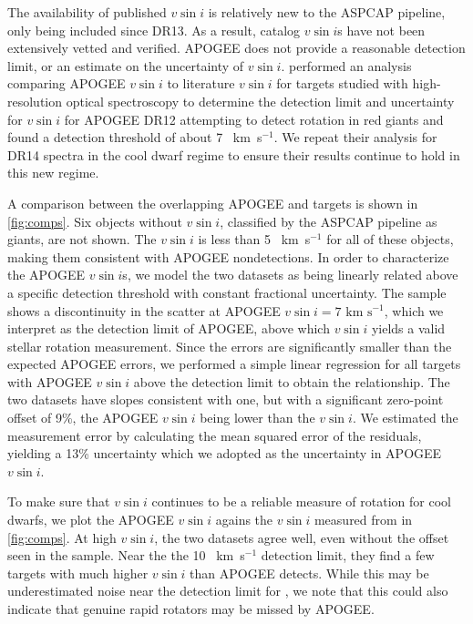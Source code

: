 \documentclass[manuscript]{aastex6}
\newcommand{\vsini}{\ensuremath{v \sin i}}
\newcommand{\kms}{\textrm{~km~s}\ensuremath{^{-1}}}
\begin{document}
The availability of published \vsini{} is relatively new to the ASPCAP pipeline, only
being included since DR13. As a result, catalog \vsini{}s have not been 
extensively vetted and verified. APOGEE does not provide a reasonable
detection limit, or an estimate on the uncertainty of \vsini{}. 
\citet{Tayar15} performed an analysis comparing APOGEE \vsini{} to literature
\vsini{} for targets studied with high-resolution optical spectroscopy to 
determine the detection limit and
uncertainty for \vsini{} for APOGEE DR12 attempting to detect rotation in red
giants and found a detection threshold of about 7 \kms. We repeat their 
analysis for DR14 spectra in the cool dwarf regime to ensure their results
continue to hold in this new regime. 

A comparison between the overlapping APOGEE and \citet{Bruntt12} targets is shown in
\cref{fig:comps}. Six objects without \vsini{}, classified by the ASPCAP 
pipeline as giants, are not shown. The \citet{Bruntt12} \vsini{} is less than 5 \kms{} for all of 
these objects, making them consistent with APOGEE
nondetections.  In order to characterize the APOGEE \vsini{}s, we model the 
two datasets as being linearly related above a specific detection threshold 
with constant fractional uncertainty. The sample shows a 
discontinuity in the scatter at APOGEE \(\vsini=7\kms\), which we 
interpret as the detection limit of APOGEE, above which \vsini{} yields a 
valid stellar rotation measurement. Since the \citet{Bruntt12} errors are
significantly smaller than the expected APOGEE errors, we performed a simple 
linear regression for all targets with APOGEE \vsini{} above the detection 
limit to obtain the relationship. The two datasets have slopes
consistent with one, but with a significant zero-point offset of 9\%,
the APOGEE \vsini{} being lower than the \citet{Bruntt12}
\vsini{}. We estimated the measurement error by calculating the mean squared 
error of the residuals, yielding a 13\% uncertainty which we adopted as the 
uncertainty in APOGEE \vsini{}.

To make sure that \vsini{} continues to be a reliable measure of rotation for
cool dwarfs, we plot the APOGEE \vsini{} agains the \vsini{} measured from
\citet{Stauffer87} in \cref{fig:comps}. At high \vsini{}, the two datasets 
agree well, even
without the offset seen in the \citet{Bruntt12} sample. Near the the 10
\kms{} \citet{Stauffer87} detection limit, they find a few targets with
much higher \vsini{} than APOGEE detects. While this may be
underestimated noise near the detection limit for \citet{Stauffer87}, we
note that this could also indicate that genuine rapid rotators may be
missed by APOGEE\@.
\end{document}
